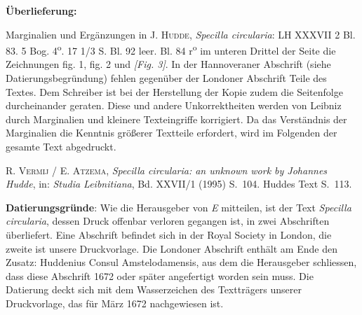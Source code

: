       
               
                \begin{ledgroupsized}[r]{120mm}
                \footnotesize 
                \pstart                
                \noindent\textbf{\"{U}berlieferung:}   
                \pend
                \end{ledgroupsized}
            
              
                            \begin{ledgroupsized}[r]{114mm}
                            \footnotesize 
                            \pstart \parindent -6mm
                            Marginalien und Erg\"{a}nzungen in \textsc{J. Hudde}, \cite{00125}\textit{Specilla circularia}: LH XXXVII 2 Bl. 83. 5 Bog. 4\textsuperscript{o}. 17 1/3 S. Bl. 92 leer. Bl. 84 r\textsuperscript{o} im unteren Drittel der Seite die Zeichnungen fig. 1, fig. 2 und \textit{[Fig. 3]}. In der Hannoveraner Abschrift (siehe Datierungsbegr\"{u}ndung) fehlen gegen\"{u}ber der Londoner Abschrift Teile des Textes. Dem Schreiber ist bei der Herstellung der Kopie zudem die Seitenfolge durcheinander geraten. Diese und andere Unkorrektheiten werden von Leibniz durch Marginalien und kleinere Texteingriffe korrigiert. Da das Verst\"{a}ndnis der Marginalien die Kenntnis gr\"{o}ßerer Textteile erfordert, wird im Folgenden der gesamte Text abgedruckt.\pend
                            \end{ledgroupsized}
              
                            \begin{ledgroupsized}[r]{114mm}
                            \footnotesize 
                            \pstart \parindent -6mm
                            \textsc{R. Vermij / E. Atzema}, \cite{00194}\textit{Specilla circularia: an unknown work by Johannes Hudde}, in: \textit{Studia Leibnitiana}, Bd. XXVII/1 (1995) S.~104. Huddes Text S.~113. \pend
                            \end{ledgroupsized}
                \vspace*{5mm}
                \begin{ledgroup}
                \footnotesize 
                \pstart
            \noindent\footnotesize{\textbf{Datierungsgr\"{u}nde}: Wie die Herausgeber von \textit{E} mitteilen, ist der Text \textit{Specilla circularia}, dessen Druck offenbar verloren gegangen ist, in zwei Abschriften \"{u}berliefert. Eine Abschrift befindet sich in der Royal Society in London, die zweite ist unsere Druckvorlage. Die Londoner Abschrift enth\"{a}lt am Ende den Zusatz: Huddenius\protect{} Consul Amstelodamensis\protect{}, aus dem die Herausgeber schliessen, dass diese Abschrift 1672 oder sp\"{a}ter angefertigt worden sein muss. Die Datierung deckt sich mit dem  Wasserzeichen des Texttr\"{a}gers unserer Druckvorlage, das f\"{u}r M\"{a}rz 1672 nachgewiesen ist.}
                \pend
                \end{ledgroup}
            
